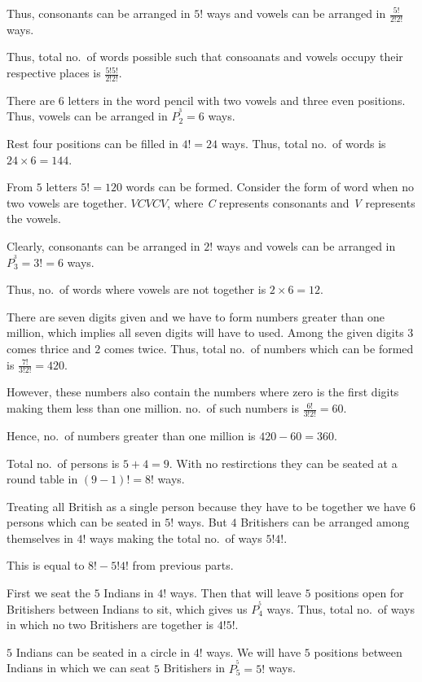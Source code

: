   Thus, consonants can be arranged in $5!$ ways and vowels can be arranged in $\frac{5!}{2!2!}$ ways.

  Thus, total no.\ of words possible such that consoanats and vowels occupy their respective places is
  $\frac{5!5!}{2!2!}$.
\item There are $6$ letters in the word pencil with two vowels and three even positions. Thus, vowels can be
  arranged in $P_2^^3 = 6$ ways.

  Rest four positions can be filled in $4! = 24$ ways. Thus, total no.\ of words is $24\times6 = 144$.
\item From $5$ letters $5!= 120$ words can be formed. Consider the form of word when no two vowels are
  together. $VCVCV$, where {\it C} represents consonants and {\it V} represents the vowels.

  Clearly, consonants can be arranged in $2!$ ways and vowels can be arranged in $P_3^^3 = 3! = 6$ ways.

  Thus, no.\ of words where vowels are not together is $2\times6 = 12$.
\item There are seven digits given and we have to form numbers greater than one million, which implies all
  seven digits will have to used. Among the given digits $3$ comes thrice and $2$ comes twice. Thus, total
  no.\ of numbers which can be formed is $\frac{7!}{3!2!} = 420$.

  However, these numbers also contain the numbers where zero is the first digits making them less than one
  million. no.\ of such numbers is $\frac{6!}{3!2!} = 60$.

  Hence, no.\ of numbers greater than one million is $420 - 60 = 360$.
\item
  \startitemize[i]
  \item Total no.\ of persons is $5 + 4 = 9$. With no restirctions they can be seated at a round table in $(9
    - 1)! = 8!$ ways.
  \item Treating all British as a single person because they have to be together we have $6$ persons which
    can be seated in $5!$ ways. But $4$ Britishers can be arranged among themselves in $4!$ ways making the
    total no.\ of ways $5!4!$.
  \item This is equal to $8! - 5!4!$ from previous parts.
  \item First we seat the $5$ Indians in $4!$ ways. Then that will leave $5$ positions open for Britishers
    between Indians to sit, which gives us $P_4^^5$ ways. Thus, total no.\ of ways in which no two Britishers
    are together is $4!5!$.
  \stopitemize
\item $5$ Indians can be seated in a circle in $4!$ ways. We will have $5$ positions between Indians in
  which we can seat $5$ Britishers in $P_5^^5 = 5!$ ways.


